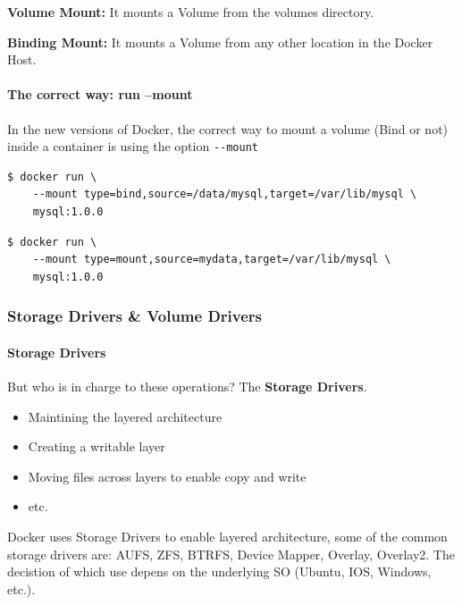 \documentclass{article}
\newenvironment{blocktemplateI}[1]{%
    \tcolorbox[beamer,%
    noparskip,breakable,
    colframe=Violet,%
    colbacklower=Black,%
    title=#1]}%
    {\endtcolorbox}
\newenvironment{codetemplate}[1][]{%
  \mybasecolorbox[#1]
  \itshape
}{%
  \endmybasecolorbox
}
\begin{document}
\textbf{Volume Mount:} It mounts a Volume from the volumes directory.

\textbf{Binding Mount:} It mounts a Volume from any other location in the Docker Host.

\paragraph{The correct way: run --mount}

\begin{blocktemplateI}{NOTE}
In the new versions of Docker, the correct way to mount a volume (Bind or not) inside a container is using the option \verb|--mount|
\begin{codetemplate}{}
\begin{verbatim}
$ docker run \
    --mount type=bind,source=/data/mysql,target=/var/lib/mysql \ 
    mysql:1.0.0
\end{verbatim}
\end{codetemplate}
\begin{codetemplate}{}
\begin{verbatim}
$ docker run \
    --mount type=mount,source=mydata,target=/var/lib/mysql \ 
    mysql:1.0.0
\end{verbatim}
\end{codetemplate}
\end{blocktemplateI}

\subsubsection{Storage Drivers \& Volume Drivers}

\paragraph{Storage Drivers}

But who is in charge to these operations? The \textbf{Storage Drivers}.

\begin{itemize}
    \item Maintining the layered architecture
    \item Creating a writable layer
    \item Moving files across layers to enable copy and write 
    \item etc.
\end{itemize}

Docker uses Storage Drivers to enable layered architecture, some of the common storage drivers are: AUFS, ZFS, BTRFS, Device Mapper, Overlay, Overlay2. The decistion of which use depens on the underlying SO (Ubuntu, IOS, Windows, etc.).
\end{document}
